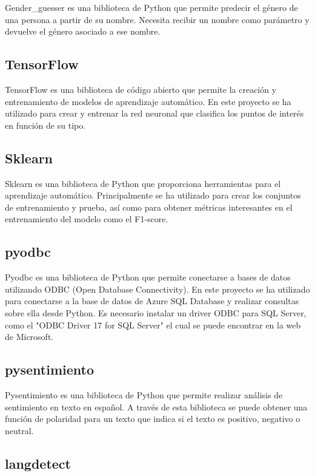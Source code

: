 Gender\_guesser es una biblioteca de Python que permite predecir el género de una persona a partir de su nombre. Necesita recibir un nombre
como parámetro y devuelve el género asociado a ese nombre.

\subsection{TensorFlow}

TensorFlow es una biblioteca de código abierto que permite la creación
y entrenamiento de modelos de aprendizaje automático. En este proyecto se
ha utilizado para crear y entrenar la red neuronal que clasifica los puntos de
interés en función de su tipo.\cite{tensorflowAbout}

\subsection{Sklearn}

Sklearn es una biblioteca de Python que proporciona herramientas para el aprendizaje automático.
Principalmente se ha utilizado para crear los conjuntos de entrenamiento y prueba, así como para obtener métricas interesantes en el entrenamiento del modelo como el F1-score.

\subsection{pyodbc}

Pyodbc es una biblioteca de Python que permite conectarse a bases de datos utilizando ODBC (Open Database Connectivity).
En este proyecto se ha utilizado para conectarse a la base de datos de Azure SQL Database y realizar consultas sobre ella desde Python.
Es necesario instalar un driver ODBC para SQL Server, como el "ODBC Driver 17 for SQL Server" el cual se puede encontrar en la web de Microsoft.

\subsection{pysentimiento}

Pysentimiento es una biblioteca de Python que permite realizar análisis de sentimiento en texto en español.
A través de esta biblioteca se puede obtener una función de polaridad para un texto que indica si el texto es positivo, negativo o neutral.

\subsection{langdetect}

